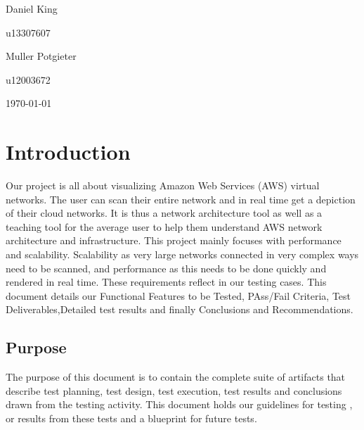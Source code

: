 \documentclass[hidelinks,a4paper,12pt]{article}
\begin{document}
\begin{titlepage}
\begin{center}
\begin{minipage}{0.4\textwidth}
\begin{flushleft} \large
Daniel {King}
\end{flushleft}
\end{minipage}
\begin{minipage}{0.4\textwidth}
\begin{flushright} \large
\emph{}
u13307607
\end{flushright}
\end{minipage}

\begin{minipage}{0.4\textwidth}
\begin{flushleft} \large
Muller {Potgieter}
\end{flushleft}
\end{minipage}
\begin{minipage}{0.4\textwidth}
\begin{flushright} \large
\emph{}
u12003672
\end{flushright}
\end{minipage}

\vfill
{\large \today}
\end{center}
\end{titlepage}
\footnotesize
%
\normalsize


\tableofcontents
\newpage
{}

\newpage
\section{Introduction} 
Our project is all about visualizing Amazon Web Services (AWS) virtual networks. The user can scan their entire network and in real time get a depiction of their cloud networks. It is thus a network architecture tool as well as a teaching tool for the average user to help them understand AWS network architecture and infrastructure. This project mainly focuses with performance and scalability. Scalability as very large networks connected in very complex ways need to be scanned, and performance as this needs to be done quickly and rendered in real time. These requirements reflect in our testing cases. This document details our Functional Features to be Tested, PAss/Fail Criteria, Test Deliverables,Detailed test results and finally Conclusions and Recommendations.

\subsection{Purpose}
The purpose of this document is to contain the complete suite of artifacts that describe test planning, test design, test execution, test results and conclusions drawn from the testing activity. This document holds our guidelines for testing , or results from these tests and a blueprint for future tests.
\end{document}
